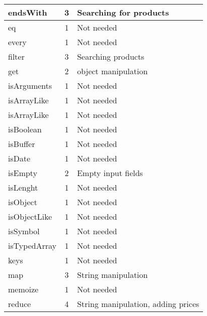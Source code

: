 \documentclass[a4paper, 12pt]{article}
\begin{document}
\begin{table}[h]
\begin{tabular}{l|c|l}
    endsWith     & 3                 & Searching for products                \\ \hline
    eq           & 1                 & Not needed                            \\ \hline
    every        & 1                 & Not needed                            \\ \hline
    filter       & 3                 & Searching products                    \\ \hline
    get          & 2                 & object manipulation                   \\ \hline
    isArguments  & 1                 & Not needed                            \\ \hline
    isArrayLike  & 1                 & Not needed                            \\ \hline
    isArrayLike  & 1                 & Not needed                            \\ \hline
    isBoolean    & 1                 & Not needed                            \\ \hline
    isBuffer     & 1                 & Not needed                            \\ \hline
    isDate       & 1                 & Not needed                            \\ \hline
    isEmpty      & 2                 & Empty input fields                    \\ \hline
    isLenght     & 1                 & Not needed                            \\ \hline
    isObject     & 1                 & Not needed                            \\ \hline
    isObjectLike & 1                 & Not needed                            \\ \hline
    isSymbol     & 1                 & Not needed                            \\ \hline
    isTypedArray & 1                 & Not needed                            \\ \hline
    keys         & 1                 & Not needed                            \\ \hline
    map          & 3                 & String manipulation                   \\ \hline
    memoize      & 1                 & Not needed                            \\ \hline
    reduce       & 4                 & String manipulation, adding prices    \\ \hline

\end{tabular}
\end{table}
\end{document}
